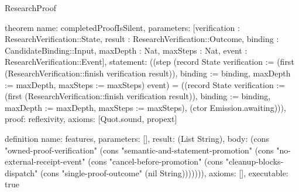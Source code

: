 \begin{lexlean}{ResearchProof}
\begin{semanticmodule}
theorem{
 name: completedProofIsSilent,
 parameters: [verification : ResearchVerification::State, result : ResearchVerification::Outcome, binding : CandidateBinding::Input, maxDepth : Nat, maxSteps : Nat, event : ResearchVerification::Event],
 statement: ((step (record State {verification := (first (ResearchVerification::finish verification result)), binding := binding, maxDepth := maxDepth, maxSteps := maxSteps}) event) = ((record State {verification := (first (ResearchVerification::finish verification result)), binding := binding, maxDepth := maxDepth, maxSteps := maxSteps}), (ctor Emission.awaiting))),
 proof: reflexivity{},
 axioms: [Quot.sound, propext]
}

definition{
 name: features,
 parameters: [],
 result: (List String),
 body: (cons "owned-proof-verification" (cons "semantic-and-statement-promotion" (cons "no-external-receipt-event" (cons "cancel-before-promotion" (cons "cleanup-blocks-dispatch" (cons "single-proof-outcome" (nil String))))))),
 axioms: [],
 executable: true
}
\end{semanticmodule}
\end{lexlean}
